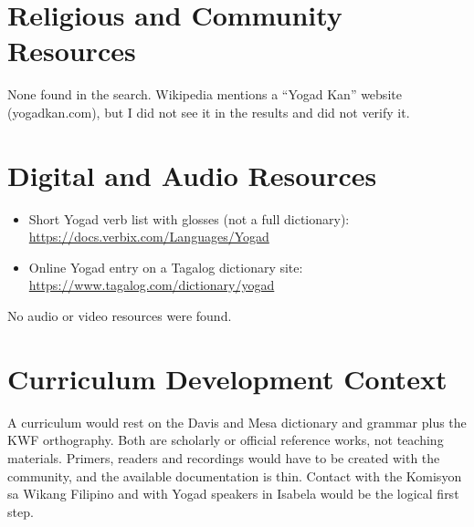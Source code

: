 \documentclass[12pt]{article}
\begin{document}
\section{Religious and Community Resources}
None found in the search. Wikipedia mentions a ``Yogad Kan'' website (yogadkan.com), but I did not see it in the results and did not verify it.

\section{Digital and Audio Resources}
\begin{itemize}
\item Short Yogad verb list with glosses (not a full dictionary): \url{https://docs.verbix.com/Languages/Yogad}
\item Online Yogad entry on a Tagalog dictionary site: \url{https://www.tagalog.com/dictionary/yogad}
\end{itemize}
No audio or video resources were found.

\section{Curriculum Development Context}
A curriculum would rest on the Davis and Mesa dictionary and grammar plus the KWF orthography. Both are scholarly or official reference works, not teaching materials. Primers, readers and recordings would have to be created with the community, and the available documentation is thin. Contact with the Komisyon sa Wikang Filipino and with Yogad speakers in Isabela would be the logical first step.
\end{document}
